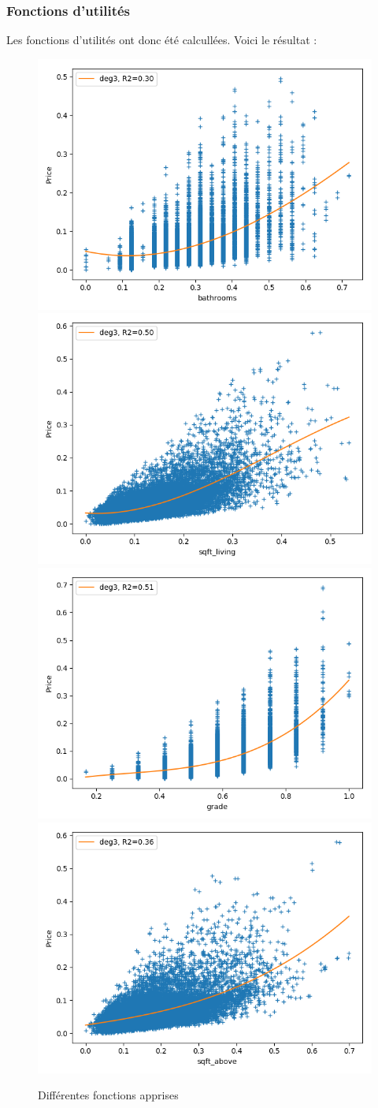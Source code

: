 \subsubsection{Fonctions d'utilités}\label{subsubsec:real-ut}
Les fonctions d'utilités ont donc été calcullées.
Voici le résultat :
\begin{figure}[H]
    \center
    \includegraphics[width=0.49\columnwidth]{pict/real/ut/bath.png}
    \includegraphics[width=0.49\columnwidth]{pict/real/ut/living.png}
    \includegraphics[width=0.49\columnwidth]{pict/real/ut/grd.png}
    \includegraphics[width=0.49\columnwidth]{pict/real/ut/above.png}
	\caption{Différentes fonctions apprises}
	\label{fig:ut_f}
\end{figure}



